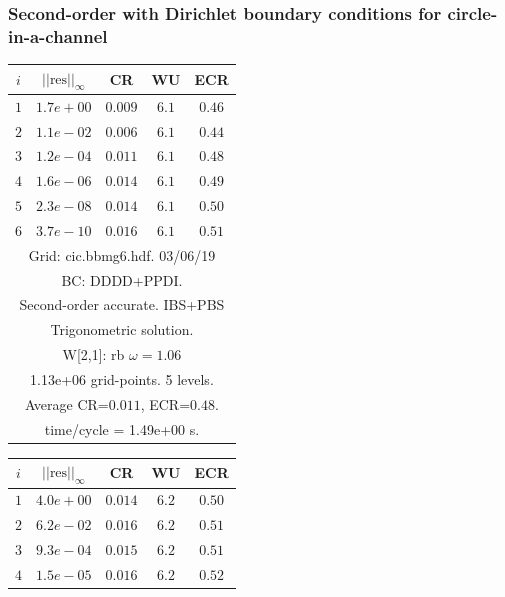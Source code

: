 \clearpage
\subsubsection{Second-order with Dirichlet boundary conditions for circle-in-a-channel}

\begin{table}[hbt]
\begin{center}
{\tablefontsize
\begin{tabular}{|c|c|c|c|c|} \hline 
 $i$   & $\vert\vert\mbox{res}\vert\vert_\infty$  &  CR     &  WU    & ECR  \\   \hline 
 $ 1$  & $ 1.7e+00$ & $0.009$ & $ 6.1$ & $0.46$ \\ 
 $ 2$  & $ 1.1e-02$ & $0.006$ & $ 6.1$ & $0.44$ \\ 
 $ 3$  & $ 1.2e-04$ & $0.011$ & $ 6.1$ & $0.48$ \\ 
 $ 4$  & $ 1.6e-06$ & $0.014$ & $ 6.1$ & $0.49$ \\ 
 $ 5$  & $ 2.3e-08$ & $0.014$ & $ 6.1$ & $0.50$ \\ 
 $ 6$  & $ 3.7e-10$ & $0.016$ & $ 6.1$ & $0.51$ \\ 
\hline 
\multicolumn{5}{|c|}{Grid: cic.bbmg6.hdf. 03/06/19}  \\
\multicolumn{5}{|c|}{BC: DDDD+PPDI.}  \\
\multicolumn{5}{|c|}{Second-order accurate. IBS+PBS}  \\
\multicolumn{5}{|c|}{Trigonometric solution.}  \\
\multicolumn{5}{|c|}{W[2,1]: rb $\omega=1.06$}  \\
\multicolumn{5}{|c|}{1.13e+06 grid-points. 5 levels.}  \\
\multicolumn{5}{|c|}{Average CR=$0.011$, ECR=$0.48$.}  \\
\multicolumn{5}{|c|}{time/cycle = 1.49e+00 s.}  \\
\hline 
\end{tabular}
\begin{tabular}{|c|c|c|c|c|} \hline 
 $i$   & $\vert\vert\mbox{res}\vert\vert_\infty$  &  CR     &  WU    & ECR  \\   \hline 
 $ 1$  & $ 4.0e+00$ & $0.014$ & $ 6.2$ & $0.50$ \\ 
 $ 2$  & $ 6.2e-02$ & $0.016$ & $ 6.2$ & $0.51$ \\ 
 $ 3$  & $ 9.3e-04$ & $0.015$ & $ 6.2$ & $0.51$ \\ 
 $ 4$  & $ 1.5e-05$ & $0.016$ & $ 6.2$ & $0.52$ \\ 

\end{tabular}}
\end{center}
\end{table}
